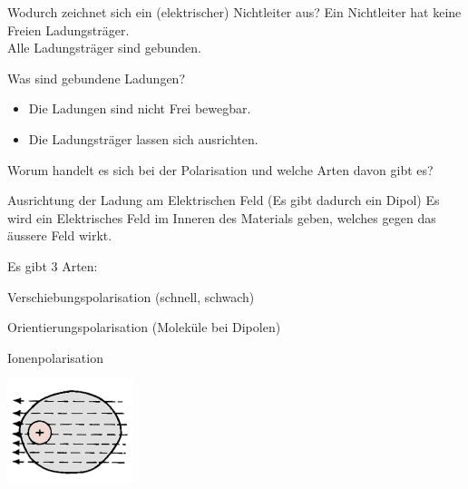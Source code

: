\begin{lk}{Wodurch zeichnet sich ein (elektrischer) Nichtleiter aus?}
	Ein Nichtleiter hat keine Freien Ladungsträger.\\
	Alle Ladungsträger sind gebunden.
\end{lk}

\begin{lk}{Was sind gebundene Ladungen?}
	\begin{itemize}
		\item Die Ladungen sind nicht Frei bewegbar.
		\item Die Ladungsträger lassen sich ausrichten.
	\end{itemize}
\end{lk}

\begin{lk}{Worum handelt es sich bei der Polarisation und welche Arten davon gibt es?}
	\begin{compactitem}
		\item Ausrichtung der Ladung am Elektrischen Feld (Es gibt dadurch ein Dipol) Es wird ein Elektrisches Feld im Inneren des Materials geben, welches gegen das äussere Feld wirkt.
		\item Es gibt 3 Arten:
		\begin{compactitem}
			\item Verschiebungspolarisation (schnell, schwach)
			\item Orientierungspolarisation (Moleküle bei Dipolen)
			\item Ionenpolarisation
		\end{compactitem}
	\end{compactitem} 
	\begin{center}
		\begin{minipage}{0.18\textwidth}
			\includegraphics[width=\textwidth]{pics/ES_Ausrichtungspolarisation.png}\\

\end{minipage}
\end{center}
\end{lk}
